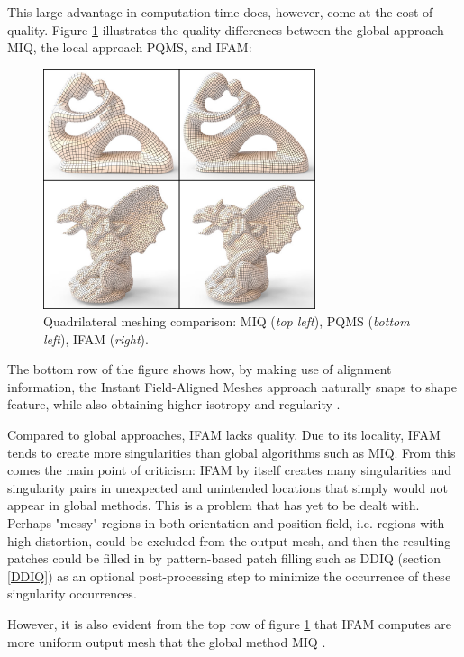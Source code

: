 \documentclass{ACGSeminar}
\begin{document}
This large advantage in computation time does, however, come at the cost of quality. Figure \ref{fig:quality} illustrates the quality differences between the global approach MIQ, the local approach PQMS, and IFAM:

\begin{figure}[htb!]
	\begin{centering}
		\includegraphics[width=8cm]{img/quality.png}\par
	\end{centering}
	\caption{Quadrilateral meshing comparison: MIQ \cite{bommes2009mixed} (\textit{top left}), PQMS \cite{tarini2010practical} (\textit{bottom left}), IFAM (\textit{right}). \cite{jakob2015instant}}
	\label{fig:quality}
\end{figure}

The bottom row of the figure shows how, by making use of alignment information, the Instant Field-Aligned Meshes approach naturally snaps to shape feature, while also obtaining higher isotropy and regularity \cite{jakob2015instant}.

Compared to global approaches, IFAM lacks quality. Due to its locality, IFAM tends to create more singularities than global algorithms such as MIQ. From this comes the main point of criticism: IFAM by itself creates many singularities and singularity pairs in unexpected and unintended locations that simply would not appear in global methods. This is a problem that has yet to be dealt with. Perhaps "messy" regions in both orientation and position field, i.e. regions with high distortion, could be excluded from the output mesh, and then the resulting patches could be filled in by pattern-based patch filling such as DDIQ (section \ref{DDIQ}) as an optional post-processing step to minimize the occurrence of these singularity occurrences.

However, it is also evident from the top row of figure \ref{fig:quality} that IFAM computes are more uniform output mesh that the global method MIQ \cite{jakob2015instant}.\bigskip
\end{document}
